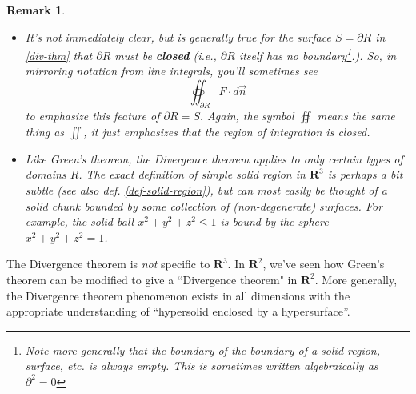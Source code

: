\documentclass[12pt]{article}
\numberwithin{equation}{subsection}
\numberwithin{figure}{subsection}
\theoremstyle{note}
\newtheorem{remark}[subsection]{Remark}
\begin{document}
{\begin{remark}
\begin{itemize}
 \item It's not immediately clear, but is generally true for the surface $S=\partial R$ in \eqref{div-thm} that $\partial R$ must be \textbf{closed} (i.e., $\partial R$ itself has no boundary\footnote{Note more generally that the boundary of the boundary of a solid region, surface, etc. is always empty. This is sometimes written algebraically as $\partial^2=0$}.). So, in mirroring notation from line integrals, you'll sometimes see \[ \oiint_{\partial R} F\cdot d\vec{n}\] to emphasize this feature of $\partial R=S $. Again, the symbol $\displaystyle \oiint$ means the same thing as $\displaystyle \iint$, it just emphasizes that the region of integration is closed. 

\item Like Green's theorem, the Divergence theorem applies to only certain types of domains $R$. The exact definition of \textit{simple solid region in $\mathbf{R}^3$} is perhaps a bit subtle (see also def. \ref{def-solid-region}), but can most easily be thought of a solid chunk bounded by some collection of (non-degenerate) surfaces. For example, the solid ball $x^2+y^2+z^2\leq 1$ is bound by the sphere $x^2+y^2+z^2=1$. 
\end{itemize}
\end{remark}

 The Divergence theorem is \textit{not} specific to $\mathbf{R}^3$. In $\mathbf{R}^2$, we've seen how Green's theorem can be modified to give a ``Divergence theorem" in $\mathbf{R}^2$. More generally, the Divergence theorem phenomenon exists in all dimensions with the appropriate understanding of ``hypersolid enclosed by a hypersurface''.





}
\end{document}
